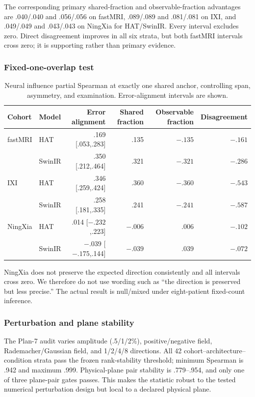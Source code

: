 The corresponding primary shared-fraction and observable-fraction advantages are .040/.040 and .056/.056 on fastMRI, .089/.089 and .081/.081 on IXI, and .049/.049 and .043/.043 on NingXia for HAT/SwinIR. Every interval excludes zero. Direct disagreement improves in all six strata, but both fastMRI intervals cross zero; it is supporting rather than primary evidence.

\subsubsection{Fixed-one-overlap test}
\begin{table}[t]
\centering
\caption{Neural influence partial Spearman at exactly one shared anchor, controlling span, asymmetry, and examination. Error-alignment intervals are shown.}
\label{tab:fixed}
\setlength{\tabcolsep}{4pt}
\begin{tabular}{llrrrr}
\toprule
Cohort & Model & Error alignment & Shared fraction & Observable fraction & Disagreement \\
\midrule
fastMRI & HAT & .169 [.053,.283] & .135 & $-.135$ & $-.161$ \\
 & SwinIR & .350 [.212,.464] & .321 & $-.321$ & $-.286$ \\
IXI & HAT & .346 [.259,.424] & .360 & $-.360$ & $-.543$ \\
 & SwinIR & .258 [.181,.335] & .241 & $-.241$ & $-.587$ \\
NingXia & HAT & .014 [$-.232$,.223] & $-.006$ & .006 & $-.102$ \\
 & SwinIR & $-.039$ [$-.175$,.144] & $-.039$ & .039 & $-.072$ \\
\bottomrule
\end{tabular}
\end{table}

NingXia does not preserve the expected direction consistently and all intervals cross zero. We therefore do not use wording such as “the direction is preserved but less precise.” The actual result is null/mixed under eight-patient fixed-count inference.

\subsubsection{Perturbation and plane stability}
The Plan-7 audit varies amplitude (.5/1/2\%), positive/negative field, Rademacher/Gaussian field, and 1/2/4/8 directions. All 42 cohort--architecture--condition strata pass the frozen rank-stability threshold; minimum Spearman is .942 and maximum .999. Physical-plane pair stability is .779--.954, and only one of three plane-pair gates passes. This makes the statistic robust to the tested numerical perturbation design but local to a declared physical plane.

